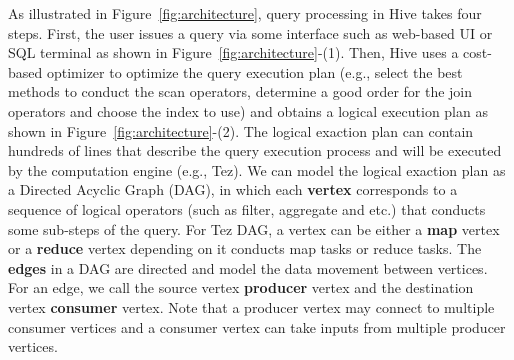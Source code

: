 As illustrated in Figure~\ref{fig:architecture}, query processing in Hive takes four steps. First, the user issues a query via some interface such as web-based UI or SQL terminal as shown in Figure~\ref{fig:architecture}-(1). Then, Hive uses a cost-based optimizer to optimize the query execution plan (e.g., select the best methods to conduct the scan operators, determine a good order for the join operators and choose the index to use) and obtains a logical execution plan as shown in Figure~\ref{fig:architecture}-(2). The logical exaction plan can contain hundreds of lines that describe the query execution process and will be executed by the computation engine (e.g., Tez). We can model the logical exaction plan as a Directed Acyclic Graph (DAG), in which each \textbf{vertex} corresponds to a sequence of logical operators (such as filter, aggregate and etc.) that conducts some sub-steps of the query. For Tez DAG, a vertex can be either a \textbf{map} vertex or a \textbf{reduce} vertex depending on it conducts map tasks or reduce tasks. The \textbf{edges} in a DAG are directed and model the data movement between vertices. For an edge, we call the source vertex \textbf{producer} vertex and the destination vertex \textbf{consumer} vertex. Note that a producer vertex may connect to multiple consumer vertices and a consumer vertex can take inputs from multiple producer vertices. 
 



